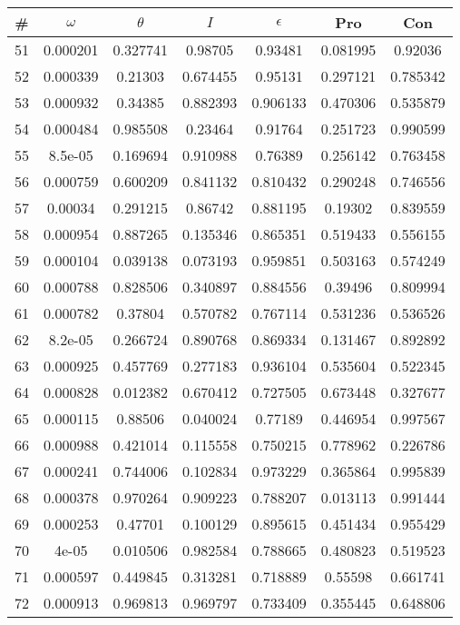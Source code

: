 \newpage
\begin{table}
\begin{tabular}{c|c|c|c|c|c|c}
\# & $\omega$ & $\theta$ & $I$ & $\epsilon$ & Pro & Con\\
\hline
51 & 0.000201 & 0.327741 & 0.98705 & 0.93481 & 0.081995 & 0.92036\\
52 & 0.000339 & 0.21303 & 0.674455 & 0.95131 & 0.297121 & 0.785342\\
53 & 0.000932 & 0.34385 & 0.882393 & 0.906133 & 0.470306 & 0.535879\\
54 & 0.000484 & 0.985508 & 0.23464 & 0.91764 & 0.251723 & 0.990599\\
55 & 8.5e-05 & 0.169694 & 0.910988 & 0.76389 & 0.256142 & 0.763458\\
56 & 0.000759 & 0.600209 & 0.841132 & 0.810432 & 0.290248 & 0.746556\\
57 & 0.00034 & 0.291215 & 0.86742 & 0.881195 & 0.19302 & 0.839559\\
58 & 0.000954 & 0.887265 & 0.135346 & 0.865351 & 0.519433 & 0.556155\\
59 & 0.000104 & 0.039138 & 0.073193 & 0.959851 & 0.503163 & 0.574249\\
60 & 0.000788 & 0.828506 & 0.340897 & 0.884556 & 0.39496 & 0.809994\\
61 & 0.000782 & 0.37804 & 0.570782 & 0.767114 & 0.531236 & 0.536526\\
62 & 8.2e-05 & 0.266724 & 0.890768 & 0.869334 & 0.131467 & 0.892892\\
63 & 0.000925 & 0.457769 & 0.277183 & 0.936104 & 0.535604 & 0.522345\\
64 & 0.000828 & 0.012382 & 0.670412 & 0.727505 & 0.673448 & 0.327677\\
65 & 0.000115 & 0.88506 & 0.040024 & 0.77189 & 0.446954 & 0.997567\\
66 & 0.000988 & 0.421014 & 0.115558 & 0.750215 & 0.778962 & 0.226786\\
67 & 0.000241 & 0.744006 & 0.102834 & 0.973229 & 0.365864 & 0.995839\\
68 & 0.000378 & 0.970264 & 0.909223 & 0.788207 & 0.013113 & 0.991444\\
69 & 0.000253 & 0.47701 & 0.100129 & 0.895615 & 0.451434 & 0.955429\\
70 & 4e-05 & 0.010506 & 0.982584 & 0.788665 & 0.480823 & 0.519523\\
71 & 0.000597 & 0.449845 & 0.313281 & 0.718889 & 0.55598 & 0.661741\\
72 & 0.000913 & 0.969813 & 0.969797 & 0.733409 & 0.355445 & 0.648806\\

\end{tabular}
\end{table}
